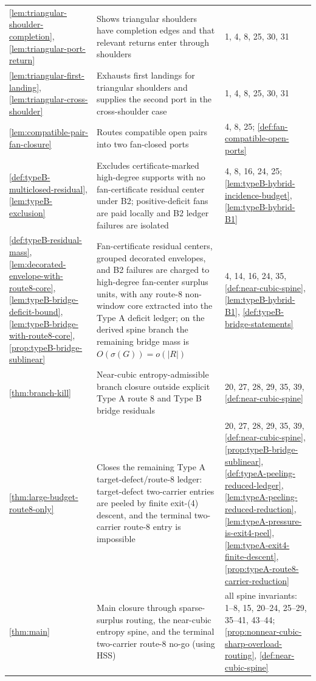\documentclass[11pt]{article}
\begin{document}
{\begin{longtable}{L{0.31\textwidth} L{0.42\textwidth} L{0.17\textwidth}}
\cref{lem:triangular-shoulder-completion}, \cref{lem:triangular-port-return} & Shows triangular shoulders have completion edges and that relevant returns enter through shoulders & 1, 4, 8, 25, 30, 31 \\
\cref{lem:triangular-first-landing}, \cref{lem:triangular-cross-shoulder} & Exhausts first landings for triangular shoulders and supplies the second port in the cross-shoulder case & 1, 4, 8, 25, 30, 31 \\
\cref{lem:compatible-pair-fan-closure} & Routes compatible open pairs into two fan-closed ports & 4, 8, 25; \cref{def:fan-compatible-open-ports} \\
\cref{def:typeB-multiclosed-residual}, \cref{lem:typeB-exclusion} & Excludes certificate-marked high-degree supports with no fan-certificate residual center under B2; positive-deficit fans are paid locally and B2 ledger failures are isolated & 4, 8, 16, 24, 25; \cref{lem:typeB-hybrid-incidence-budget}, \cref{lem:typeB-hybrid-B1} \\
\cref{def:typeB-residual-mass}, \cref{lem:decorated-envelope-with-route8-core}, \cref{lem:typeB-bridge-deficit-bound}, \cref{lem:typeB-bridge-with-route8-core}, \cref{prop:typeB-bridge-sublinear} & Fan-certificate residual centers, grouped decorated envelopes, and B2 failures are charged to high-degree fan-center surplus units, with any route-8 non-window core extracted into the Type A deficit ledger; on the derived spine branch the remaining bridge mass is $O(\sigma(G))=o(|R|)$ & 4, 14, 16, 24, 35, \cref{def:near-cubic-spine}, \cref{lem:typeB-hybrid-B1}, \cref{def:typeB-bridge-statements} \\
\cref{thm:branch-kill} & Near-cubic entropy-admissible branch closure outside explicit Type A route 8 and Type B bridge residuals & 20, 27, 28, 29, 35, 39, \cref{def:near-cubic-spine} \\
\cref{thm:large-budget-route8-only} & Closes the remaining Type A target-defect/route-8 ledger: target-defect two-carrier entries are peeled by finite exit-\textup{(4)} descent, and the terminal two-carrier route-8 entry is impossible & 20, 27, 28, 29, 35, 39, \cref{def:near-cubic-spine}, \cref{prop:typeB-bridge-sublinear}, \cref{def:typeA-peeling-reduced-ledger}, \cref{lem:typeA-peeling-reduced-reduction}, \cref{lem:typeA-pressure-is-exit4-peel}, \cref{lem:typeA-exit4-finite-descent}, \cref{prop:typeA-route8-carrier-reduction} \\
\cref{thm:main} & Main closure through sparse-surplus routing, the near-cubic entropy spine, and the terminal two-carrier route-8 no-go (using HSS) & all spine invariants: 1--8, 15, 20--24, 25--29, 35--41, 43--44; \cref{prop:nonnear-cubic-sharp-overload-routing}, \cref{def:near-cubic-spine} \\
\bottomrule
\end{longtable}
}
\end{document}
